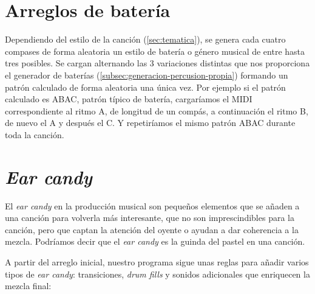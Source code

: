 \section{Arreglos de batería}
Dependiendo del estilo de la canción (\ref{sec:tematica}), se genera cada cuatro compases de forma aleatoria un estilo de batería o género musical de entre hasta tres posibles. Se cargan alternando las 3 variaciones distintas que nos proporciona el generador de baterías (\ref{subsec:generacion-percusion-propia}) formando un patrón calculado de forma aleatoria una única vez. Por ejemplo si el patrón calculado es ABAC, patrón típico de batería, cargaríamos el MIDI correspondiente al ritmo A, de longitud de un compás, a continuación el ritmo B, de nuevo el A y después el C. Y repetiríamos el mismo patrón ABAC durante toda la canción.

\section{\textit{Ear candy}}
\label{sec:ear-candy}
El \textit{ear candy} en la producción musical son pequeños elementos que se añaden a una canción para volverla más interesante, que no son imprescindibles para la canción, pero que captan la atención del oyente o ayudan a dar coherencia a la mezcla. Podríamos decir que el \textit{ear candy} es la guinda del pastel en una canción.

A partir del arreglo inicial, nuestro programa sigue unas reglas para añadir varios tipos de \textit{ear candy}: transiciones, \textit{drum fills} y sonidos adicionales que enriquecen la mezcla final:


